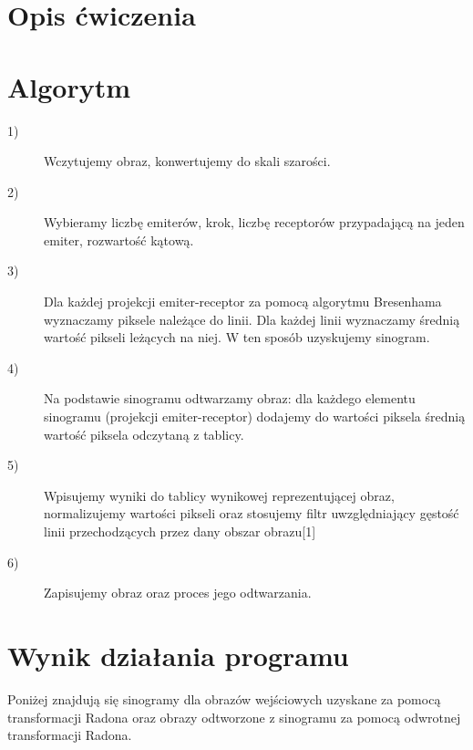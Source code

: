 \documentclass{article}
\begin{document}


\section{Opis ćwiczenia}


\section{Algorytm}
\begin{description}
\item[1)] Wczytujemy obraz, konwertujemy do skali szarości.
\item[2)] Wybieramy liczbę emiterów, krok, liczbę receptorów przypadającą na jeden emiter, rozwartość kątową.
\item[3)] Dla każdej projekcji emiter-receptor za pomocą algorytmu Bresenhama wyznaczamy piksele należące do linii. Dla każdej linii wyznaczamy średnią wartość pikseli leżących na niej. W ten sposób uzyskujemy sinogram.
\item[4)] Na podstawie sinogramu odtwarzamy obraz: dla każdego elementu sinogramu (projekcji emiter-receptor) dodajemy do wartości piksela średnią wartość piksela odczytaną z tablicy. 
\item[5)] Wpisujemy wyniki do tablicy wynikowej reprezentującej obraz, normalizujemy wartości pikseli oraz stosujemy filtr uwzględniający gęstość linii przechodzących przez dany obszar obrazu[1]
\item[6)] Zapisujemy obraz oraz proces jego odtwarzania.
\end{description}
 
\section{Wynik działania programu}
Poniżej znajdują się sinogramy dla obrazów wejściowych uzyskane za pomocą transformacji Radona oraz obrazy odtworzone z sinogramu za pomocą odwrotnej transformacji Radona.
\end{document}

